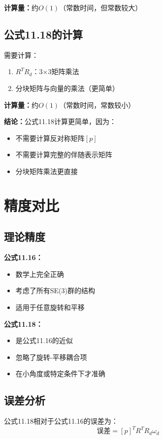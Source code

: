 \documentclass[12pt,a4paper]{article}
\begin{document}
\textbf{计算量：}约$O(1)$（常数时间，但常数较大）

\subsection{公式11.18的计算}

需要计算：
\begin{enumerate}
\item $R^T R_d$：3×3矩阵乘法
\item 分块矩阵与向量的乘法（更简单）
\end{enumerate}

\textbf{计算量：}约$O(1)$（常数时间，常数较小）

\textbf{结论：}公式11.18计算更简单，因为：
\begin{itemize}
\item 不需要计算反对称矩阵$[p]$
\item 不需要计算完整的伴随表示矩阵
\item 分块矩阵乘法更直接
\end{itemize}

\section{精度对比}

\subsection{理论精度}

\textbf{公式11.16：}
\begin{itemize}
\item 数学上完全正确
\item 考虑了所有SE(3)群的结构
\item 适用于任意旋转和平移
\end{itemize}

\textbf{公式11.18：}
\begin{itemize}
\item 是公式11.16的近似
\item 忽略了旋转-平移耦合项
\item 在小角度或特定条件下才准确
\end{itemize}

\subsection{误差分析}

公式11.18相对于公式11.16的误差为：
\begin{equation}
\text{误差} = [p]^T R^T R_d \omega_d
\end{equation}
\end{document}
